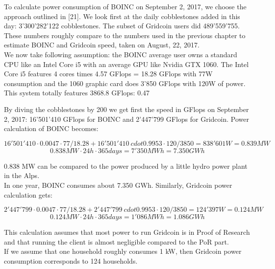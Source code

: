 To calculate power consumption of BOINC on September 2, 2017, we choose the approach outlined in [21]. We look first at the daily cobblestones added in this day: 3'300'282'122 cobblestones. The subset of Gridcoin users did 489'559'755. These numbers roughly compare to the numbers used in the previous chapter to estimate BOINC and Gridcoin speed, taken on August, 22, 2017.\\ 

We now take following assumption: the BOINC average user owns a standard CPU like an Intel Core i5 with an average GPU like Nvidia GTX 1060. The Intel Core i5 features 4 cores times 4.57 GFlops = 18.28 GFlops with 77W consumption and the 1060 graphic card does 3'850 GFlops with 120W of power. This system totally features 3868.8 GFlops: 0.47%

By diving the cobblestones by 200 we get first the speed in GFlops on September 2, 2017: 16'501'410 GFlops for BOINC and 2'447'799 GFlops for Gridcoin. Power calculation of BOINC becomes:

\[ 16'501'410 \cdot 0.0047 \cdot 77/18.28 + 16'501'410 \ cdot 0.9953 \cdot 120/3850 = 838'601 W = 0.839 MW \]
\[ 0.838 MW \cdot 24 h \cdot 365 days = 7'350 MWh = 7.350 GWh \]

0.838 MW can be compared to the power produced by a little hydro power plant in the Alps. \\
In one year, BOINC consumes about 7.350 GWh. Similarly, Gridcoin power calculation gets:

\[ 2'447'799 \cdot 0.0047 \cdot 77/18.28 + 2'447'799 \ cdot 0.9953 \cdot 120/3850 = 124'397 W = 0.124 MW \]
\[ 0.124 MW \cdot 24 h \cdot 365 days = 1'086 MWh = 1.086 GWh \]

This calculation assumes that most power to run Gridcoin is in Proof of Research and that running the client is almost negligible compared to the PoR part.\\
If we assume that one household roughly consumes 1 kW, then Gridcoin power consumption corresponds to 124 households.\\



